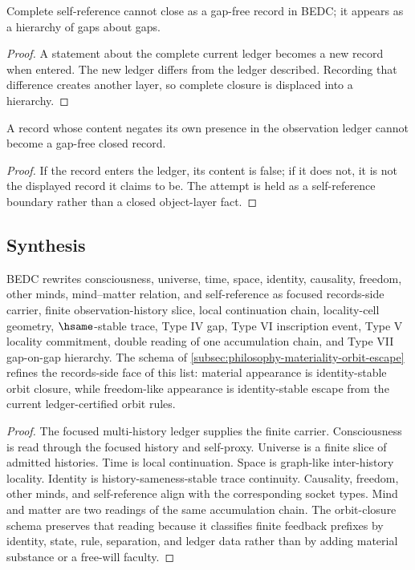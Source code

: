 \begin{theorem}
\label{thm:philosophy-self-reference-does-not-close}
Complete self-reference cannot close as a gap-free record in BEDC; it
appears as a hierarchy of gaps about gaps.
\end{theorem}
\begin{proof}
A statement about the complete current ledger becomes a new record when
entered. The new ledger differs from the ledger described. Recording
that difference creates another layer, so complete closure is displaced
into a hierarchy.
\end{proof}

\begin{corollary}
\label{cor:philosophy-russell-style-closure-refused}
A record whose content negates its own presence in the observation
ledger cannot become a gap-free closed record.
\end{corollary}
\begin{proof}
If the record enters the ledger, its content is false; if it does not,
it is not the displayed record it claims to be. The attempt is held as a
self-reference boundary rather than a closed object-layer fact.
\end{proof}

\subsection{Synthesis}
\label{subsec:philosophy-phenomenology-synthesis}

\begin{theorem}
\label{thm:philosophy-phenomenological-framework-synthesis}
BEDC rewrites consciousness, universe, time, space, identity,
causality, freedom, other minds, mind--matter relation, and
self-reference as focused records-side carrier, finite
observation-history slice, local continuation chain, locality-cell
geometry, \(\hsame\)-stable trace, Type IV gap, Type VI inscription
event, Type V locality commitment, double reading of one accumulation
chain, and Type VII gap-on-gap hierarchy. The schema of
\autoref{subsec:philosophy-materiality-orbit-escape} refines the
records-side face of this list: material appearance is identity-stable
orbit closure, while freedom-like appearance is identity-stable escape
from the current ledger-certified orbit rules.
\end{theorem}
\begin{proof}
The focused multi-history ledger supplies the finite carrier.
Consciousness is read through the focused history and self-proxy.
Universe is a finite slice of admitted histories. Time is local
continuation. Space is graph-like inter-history locality. Identity is
history-sameness-stable trace continuity. Causality, freedom, other
minds, and self-reference align with the corresponding socket types.
Mind and matter are two readings of the same accumulation chain. The
orbit-closure schema preserves that reading because it classifies
finite feedback prefixes by identity, state, rule, separation, and
ledger data rather than by adding material substance or a free-will
faculty.
\end{proof}

